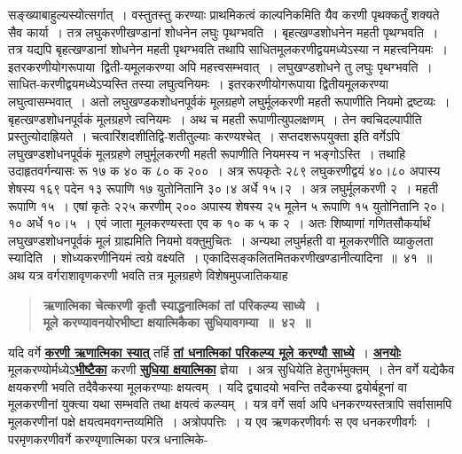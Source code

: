\documentclass[11pt, openany]{book}
\begin{document}
\begin{sloppypar}
\noindent सङ्ख्याबाहुल्यस्योत्सर्गात्~। वस्तुतस्तु करण्याः प्राथमिकत्वं काल्पनिकमिति यैव करणी पृथक्कर्तुं शक्यते सैव कार्या~। तत्र लघुकरणीखण्डानां शोधनेन लघुः पृथग्भवति~। बृहत्खण्डशोधनेन महती पृथग्भवति~। तत्र यद्यपि बृहत्खण्डानां शोधनेन महती पृथग्भवति तथापि साधितमूलकरणीद्वयमध्येऽस्या न महत्त्वनियमः~। इतरकरणीयोगरूपाया~द्विती-यमूलकरण्या अपि महत्त्वसम्भवात्~। लघुखण्डशोधने तु लघुः पृथग्भवति~। साधित-करणीद्वयमध्येऽप्यस्ति तस्या लघुत्वनियमः~। इतरकरणीयोगरूपाया द्वितीयमूलकरण्या लघुत्वासम्भवात्~। अतो लघुखण्डकशोधनपूर्वकं मूलग्रहणे लघुर्मूलकरणी महती रूपाणीति नियमो द्रष्टव्यः~। बृहत्खण्डशोधनपूर्वकं मूलग्रहणे त्वनियमः~। अथ च महती रूपाणीत्युपलक्षणम्~। तेन क्वचिदल्पापीति प्रस्तुत्योदाह्रियते~। चत्वारिंशदशीतिद्वि-शतीतुल्याः करण्यश्चेत्~। सप्तदशरूपयुक्ता इति वर्गेऽपि लघुखण्डशोधनपूर्वकं मूलग्रहणे लघुर्मूलकरणी महती रूपाणीति नियमस्य न भङ्गोऽस्ति~। तथाहि\textendash \,उदाहृतवर्गन्यासः रू १७ क ४० क ८० क २००~। अत्र रूपकृतेः २८९ लघुकरणीद्वयं ४०।८० अपास्य शेषस्य १६९ पदेन १३ रूपाणि १७ युतोनितानि ३०।४ अर्धे १५।२~। अत्र लघुर्मूलकरणी २~। महती रूपाणि १५~। एषां कृतेः २२५ करणीम् २०० अपास्य शेषस्य २५ मूलेन ५ रूपाणि १५ युतोनितानि २०।१० अर्धे १०।५~। एवं जाता मूलकरण्यस्ता एव क १० क ५ क २~। अतः शिष्याणां गणितसौकर्यार्थं लघुखण्डशोधनपूर्वकं मूलं ग्राह्यमिति नियमो वक्तुमुचितः~। अन्यथा लघुर्महती वा मूलकरणीति व्याकुलता स्यादिति~। शोध्यकरणीनियमं त्वग्रे वक्ष्यति~। एकादिसङ्कलितमितकरणीखण्डानीत्यादिना~॥~४१~॥\\

{\small अथ यत्र वर्गराशावृणकरणी भवति तत्र मूलग्रहणे विशेषमुपजातिकयाह\textendash }

 \label{4.42}
\begin{quote}
{\large \textbf{{\color{purple}ऋणात्मिका चेत्करणी कृतौ स्याद्धनात्मिकां तां परिकल्प्य साध्ये~।\\
मूले करण्यावनयोरभीष्टा क्षयात्मिकैका सुधियावगम्या~॥~४२~॥}}}
\end{quote}

यदि वर्गे \hyperref[4.42]{\textbf{करणी ऋणात्मिका स्यात्}} तर्हि \hyperref[4.42]{\textbf{तां धनात्मिकां परिकल्प्य मूले करण्यौ साध्ये}}~। \hyperref[4.42]{\textbf{अनयोः}} मूलकरण्योर्मध्येऽ\hyperref[4.42]{\textbf{भीष्टैका}} करणी \hyperref[4.42]{\textbf{सुधिया क्षयात्मिका}} ज्ञेया~। अत्र सुधियेति हेतुगर्भमुक्तम्~। तेन वर्गे यद्येकैव क्षयकरणी भवति तदैवैकस्या मूलकरण्याः क्षयत्वम्~। यदि द्व्यादयो भवन्ति तदैकस्या द्वयोर्बहूनां वा मूलकरणीनां युक्त्या यथा सम्भवति तथा क्षयत्वं कल्प्यम्~। यत्र वर्गे सर्वा अपि धनकरण्यस्तत्रापि सर्वासामपि मूलकरणीनां पक्षे क्षयत्वमवगन्तव्यमिति~। अत्रोपपत्तिः~। य एव ऋणकरणीवर्गः स एव धनकरणीवर्गः~। परमृणकरणीवर्गे करण्यृणात्मिका परत्र धनात्मिके-
\end{sloppypar}
\end{document}

